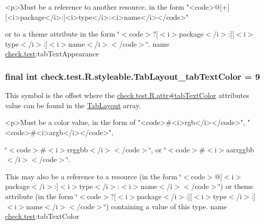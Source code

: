 \begin{DoxyVerb}      <p>Must be a reference to another resource, in the form "<code>@[+][<i>package</i>:]<i>type</i>:<i>name</i></code>"
\end{DoxyVerb}
 or to a theme attribute in the form \char`\"{}$<$code$>$?\mbox{[}$<$i$>$package$<$/i$>$\+:\mbox{]}\mbox{[}$<$i$>$type$<$/i$>$\+:\mbox{]}$<$i$>$name$<$/i$>$$<$/code$>$\char`\"{}.  name \hyperlink{namespacecheck_1_1test}{check.\+test}\+:tab\+Text\+Appearance \hypertarget{classcheck_1_1test_1_1_r_1_1styleable_a904165c0c64b601cb32165f90094f08d}{}
\subsubsection[{Tab\+Layout\+\_\+tab\+Text\+Color}]{\setlength{\rightskip}{0pt plus 5cm}final int check.\+test.\+R.\+styleable.\+Tab\+Layout\+\_\+tab\+Text\+Color = 9\hspace{0.3cm}{\ttfamily [static]}}\label{classcheck_1_1test_1_1_r_1_1styleable_a904165c0c64b601cb32165f90094f08d}
This symbol is the offset where the \hyperlink{classcheck_1_1test_1_1_r_1_1attr_a5429daadf498e6cbc4dec50f3c1251e3}{check.\+test.\+R.\+attr\#tab\+Text\+Color} attribute\textquotesingle{}s value can be found in the \hyperlink{classcheck_1_1test_1_1_r_1_1styleable_a2a3232e8d38a43f5131a16385abbbed8}{Tab\+Layout} array.

\begin{DoxyVerb}      <p>Must be a color value, in the form of "<code>#<i>rgb</i></code>", "<code>#<i>argb</i></code>",
\end{DoxyVerb}
 \char`\"{}$<$code$>$\#$<$i$>$rrggbb$<$/i$>$$<$/code$>$\char`\"{}, or \char`\"{}$<$code$>$\#$<$i$>$aarrggbb$<$/i$>$$<$/code$>$\char`\"{}. 

This may also be a reference to a resource (in the form \char`\"{}$<$code$>$@\mbox{[}$<$i$>$package$<$/i$>$\+:\mbox{]}$<$i$>$type$<$/i$>$\+:$<$i$>$name$<$/i$>$$<$/code$>$\char`\"{}) or theme attribute (in the form \char`\"{}$<$code$>$?\mbox{[}$<$i$>$package$<$/i$>$\+:\mbox{]}\mbox{[}$<$i$>$type$<$/i$>$\+:\mbox{]}$<$i$>$name$<$/i$>$$<$/code$>$\char`\"{}) containing a value of this type.  name \hyperlink{namespacecheck_1_1test}{check.\+test}\+:tab\+Text\+Color \hypertarget{classcheck_1_1test_1_1_r_1_1styleable_a7fad54db5b363c4751d9f6f6ead61bc9}{}
